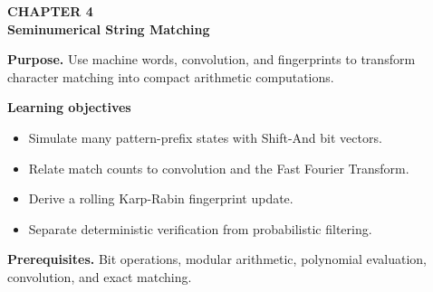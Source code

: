 \documentclass[11pt]{article}
\begin{document}
\begin{tcolorbox}[
  enhanced,breakable,colback=Primary!4,colframe=Primary,boxrule=0.9pt,
  arc=2mm,left=3mm,right=3mm,top=2.5mm,bottom=2.5mm]
{\sffamily\color{Accent}\bfseries CHAPTER 4}\\[-1pt]
{\sffamily\LARGE\bfseries\color{Primary} Seminumerical String Matching}

\vspace{2pt}
\textbf{Purpose.} Use machine words, convolution, and fingerprints to transform character matching into compact arithmetic computations.

\textbf{Learning objectives}
\begin{itemize}
  \item Simulate many pattern-prefix states with Shift-And bit vectors.
  \item Relate match counts to convolution and the Fast Fourier Transform.
  \item Derive a rolling Karp-Rabin fingerprint update.
  \item Separate deterministic verification from probabilistic filtering.
\end{itemize}

\textbf{Prerequisites.} Bit operations, modular arithmetic, polynomial evaluation, convolution, and exact matching.
\end{tcolorbox}
\end{document}
